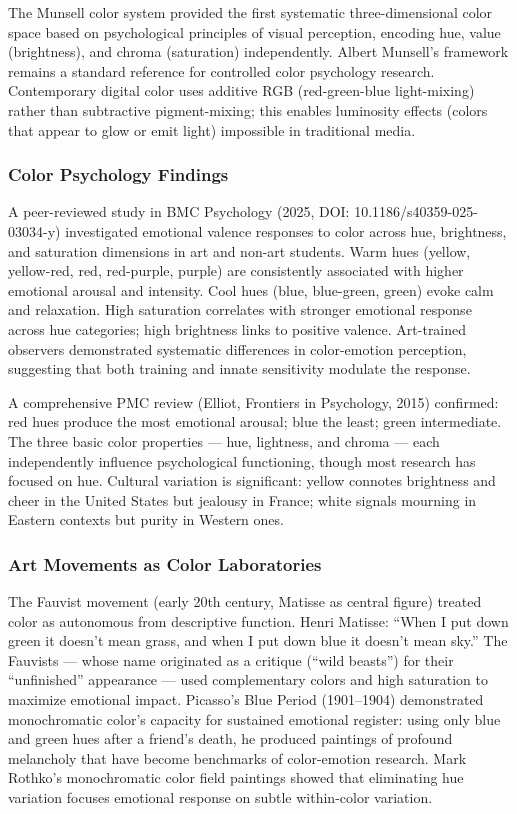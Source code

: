 \documentclass[11pt,letterpaper]{article}
\begin{document}
The Munsell color system provided the first systematic three-dimensional color space based on psychological principles of visual perception, encoding hue, value (brightness), and chroma (saturation) independently. Albert Munsell's framework remains a standard reference for controlled color psychology research. Contemporary digital color uses additive RGB (red-green-blue light-mixing) rather than subtractive pigment-mixing; this enables luminosity effects (colors that appear to glow or emit light) impossible in traditional media.

\subsubsection{Color Psychology Findings}

A peer-reviewed study in BMC Psychology (2025, DOI: 10.1186/s40359-025-03034-y) investigated emotional valence responses to color across hue, brightness, and saturation dimensions in art and non-art students. Warm hues (yellow, yellow-red, red, red-purple, purple) are consistently associated with higher emotional arousal and intensity. Cool hues (blue, blue-green, green) evoke calm and relaxation. High saturation correlates with stronger emotional response across hue categories; high brightness links to positive valence. Art-trained observers demonstrated systematic differences in color-emotion perception, suggesting that both training and innate sensitivity modulate the response.

A comprehensive PMC review (Elliot, Frontiers in Psychology, 2015) confirmed: red hues produce the most emotional arousal; blue the least; green intermediate. The three basic color properties --- hue, lightness, and chroma --- each independently influence psychological functioning, though most research has focused on hue. Cultural variation is significant: yellow connotes brightness and cheer in the United States but jealousy in France; white signals mourning in Eastern contexts but purity in Western ones.

\subsubsection{Art Movements as Color Laboratories}

The Fauvist movement (early 20th century, Matisse as central figure) treated color as autonomous from descriptive function. Henri Matisse: ``When I put down green it doesn't mean grass, and when I put down blue it doesn't mean sky.'' The Fauvists --- whose name originated as a critique (``wild beasts'') for their ``unfinished'' appearance --- used complementary colors and high saturation to maximize emotional impact. Picasso's Blue Period (1901--1904) demonstrated monochromatic color's capacity for sustained emotional register: using only blue and green hues after a friend's death, he produced paintings of profound melancholy that have become benchmarks of color-emotion research. Mark Rothko's monochromatic color field paintings showed that eliminating hue variation focuses emotional response on subtle within-color variation.
\end{document}
